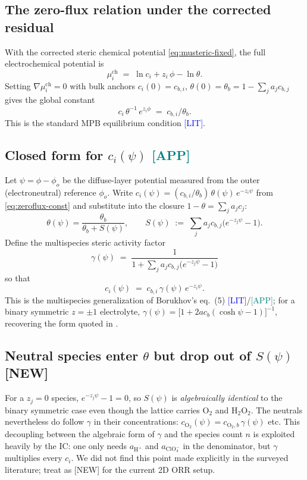 \documentclass[11pt]{article}
\newcommand{\lit}{\textcolor{blue}{[LIT]}}
\newcommand{\app}{\textcolor{teal}{[APP]}}
\newcommand{\new}{\textcolor{red!70!black}{[NEW]}}
\newcommand{\ClO}{\text{ClO}_4^-}
\newcommand{\Hp}{\text{H}^+}
\newcommand{\Otwo}{\text{O}_2}
\newcommand{\Htwo}{\text{H}_2\text{O}_2}
\newcommand{\mch}{\mu^{\mathrm{ch}}}
\begin{document}
\subsection{The zero-flux relation under the corrected residual}
With the corrected steric chemical potential
\eqref{eq:musteric-fixed}, the full electrochemical potential is
\begin{equation}
  \mch_i \;=\; \ln c_i + z_i\,\phi - \ln\theta.
  \label{eq:much}
\end{equation}
Setting $\nabla\mch_i = 0$ with bulk anchors $c_i(0)=c_{b,i}$,
$\theta(0)=\theta_b = 1-\sum_j a_j c_{b,j}$ gives the global
constant
\begin{equation}
  c_i\,\theta^{-1}\,e^{z_i\phi}
   \;=\; c_{b,i}/\theta_b.
  \label{eq:zeroflux-const}
\end{equation}
This is the standard MPB equilibrium condition \cite{kornyshev2007}
\lit{}.

\subsection{Closed form for $c_i(\psi)$ \app}
Let $\psi = \phi-\phi_o$ be the diffuse-layer potential measured from
the outer (electroneutral) reference $\phi_o$.  Write
$c_i(\psi) = (c_{b,i}/\theta_b)\,\theta(\psi)\,e^{-z_i\psi}$ from
\eqref{eq:zeroflux-const} and substitute into the closure
$1-\theta = \sum_j a_j c_j$:
\begin{equation}
  \theta(\psi)
  = \frac{\theta_b}{\theta_b + S(\psi)},\qquad
  S(\psi) \;:=\; \sum_j a_j c_{b,j}\bigl(e^{-z_j\psi}-1\bigr).
  \label{eq:theta-of-psi}
\end{equation}
Define the multispecies steric activity factor
\begin{equation}
  \boxed{\;
  \gamma(\psi) \;=\; \frac{1}{1+\sum_j a_j c_{b,j}\bigl(e^{-z_j\psi}-1\bigr)}
  \;}
  \label{eq:gamma-multispecies}
\end{equation}
so that
\begin{equation}
  c_i(\psi) \;=\; c_{b,i}\,\gamma(\psi)\,e^{-z_i\psi}.
  \label{eq:c_i-gamma}
\end{equation}
This is the multispecies generalization of Borukhov's eq.~(5)
\cite{borukhov1997} \lit{}/\app{}; for a binary symmetric $z=\pm 1$
electrolyte,
\(\gamma(\psi) = \bigl[1+2 a c_b(\cosh\psi-1)\bigr]^{-1}\),
recovering the form quoted in
\cite{kornyshev2007,bazant2009}.

\subsection{Neutral species enter $\theta$ but drop out of $S(\psi)$ \new}
For a $z_j=0$ species, $e^{-z_j\psi}-1 = 0$, so $S(\psi)$ is
\emph{algebraically identical} to the binary symmetric case even though
the lattice carries $\Otwo$ and $\Htwo$.  The neutrals nevertheless
do follow $\gamma$ in their concentrations:
$c_{\Otwo}(\psi)=c_{\Otwo,b}\,\gamma(\psi)$ etc.  This decoupling
between the algebraic form of $\gamma$ and the species count
$n$ is exploited heavily by the IC: one only needs $a_{\Hp}$ and
$a_{\ClO}$ in the denominator, but $\gamma$ multiplies every
$c_i$.  We did not find this point made explicitly in the surveyed
literature; treat as \new{} for the current 2D ORR setup.
\end{document}
